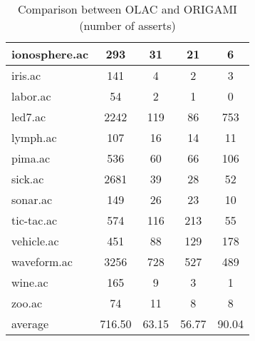 \begin{table}[htbp]
\begin{tabular}{|l|c|c|c|c|}
		\hline
		ionosphere.ac   & 293           & 31                 & 21                       & 6                             \\
		\hline
		iris.ac         & 141           & 4                  & 2                        & 3                             \\
		\hline
		labor.ac        & 54            & 2                  & 1                        & 0                             \\
		\hline
		led7.ac         & 2242          & 119                & 86                       & 753                           \\
		\hline
		lymph.ac        & 107           & 16                 & 14                       & 11                            \\
		\hline
		pima.ac         & 536           & 60                 & 66                       & 106                           \\
		\hline
		sick.ac         & 2681          & 39                 & 28                       & 52                            \\
		\hline
		sonar.ac        & 149           & 26                 & 23                       & 10                            \\
		\hline
		tic-tac.ac      & 574           & 116                & 213                      & 55                            \\
		\hline
		vehicle.ac      & 451           & 88                 & 129                      & 178                           \\
		\hline
		waveform.ac     & 3256          & 728                & 527                      & 489                           \\
		\hline
		wine.ac         & 165           & 9                  & 3                        & 1                             \\
		\hline
		zoo.ac          & 74            & 11                 & 8                        & 8                             \\
		\hline
		average         & 716.50        & 63.15              & 56.77                    & 90.04                         \\
		\hline
		\end{tabular}
	\caption{Comparison between OLAC and ORIGAMI (number of asserts)}
	\label{tab:comparison_olac_origami}
\end{table}